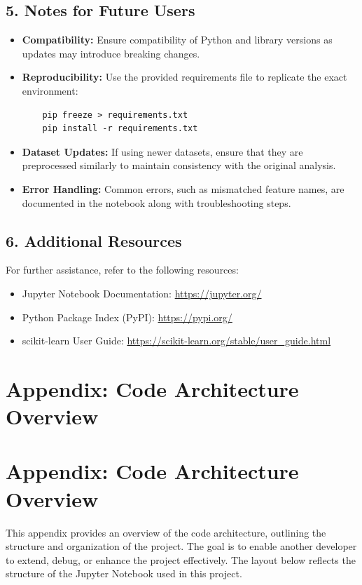 \documentclass[10pt,twocolumn]{article}
\begin{document}
\begin{itemize}
\subsection*{5. Notes for Future Users}
\begin{itemize}
    \item \textbf{Compatibility:} Ensure compatibility of Python and library versions as updates may introduce breaking changes.
    \item \textbf{Reproducibility:} Use the provided requirements file to replicate the exact environment:
    \begin{verbatim}
    pip freeze > requirements.txt
    pip install -r requirements.txt
    \end{verbatim}
    \item \textbf{Dataset Updates:} If using newer datasets, ensure that they are preprocessed similarly to maintain consistency with the original analysis.
    \item \textbf{Error Handling:} Common errors, such as mismatched feature names, are documented in the notebook along with troubleshooting steps.
\end{itemize}

\subsection*{6. Additional Resources}
For further assistance, refer to the following resources:
\begin{itemize}
    \item Jupyter Notebook Documentation: \url{https://jupyter.org/}
    \item Python Package Index (PyPI): \url{https://pypi.org/}
    \item scikit-learn User Guide: \url{https://scikit-learn.org/stable/user_guide.html}
\end{itemize}

\newpage

\section*{Appendix: Code Architecture Overview}


\section*{Appendix: Code Architecture Overview}

This appendix provides an overview of the code architecture, outlining the structure and organization of the project. The goal is to enable another developer to extend, debug, or enhance the project effectively. The layout below reflects the structure of the Jupyter Notebook used in this project.


\end{itemize}
\end{document}
